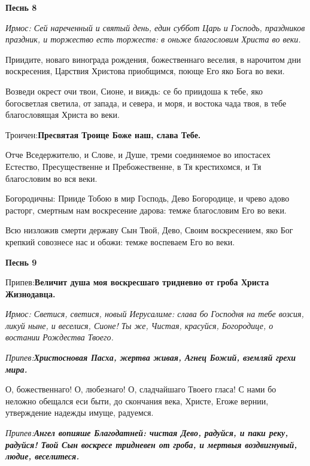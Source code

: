 \medskip\bfseries Песнь 8 

\normalfont{}\itshape Ирмос\normalfont{}: Сей нареченный и святый день, един суббот Царь и Господь, праздников праздник, и торжество есть торжеств: в оньже благословим Христа во веки. 



Приидите, новаго винограда рождения, божественнаго веселия, в нарочитом дни воскресения, Царствия Христова приобщимся, поюще Его яко Бога во веки. 



Возведи окрест очи твои, Сионе, и виждь: се бо приидоша к тебе, яко богосветлая светила, от запада, и севера, и моря, и востока чада твоя, в тебе благословящая Христа во веки. \itshape 

Троичен\normalfont{}:\bfseries  Пресвятая Троице Боже наш, слава Тебе\normalfont{}. 



Отче Вседержителю, и Слове, и Душе, треми соединяемое во ипостасех Естество, Пресущественне и Пребожественне, в Тя крестихомся, и Тя благословим во вся веки. \itshape 

Богородичны\normalfont{}: Прииде Тобою в мир Господь, Дево Богородице, и чрево адово расторг, смертным нам воскресение дарова: темже благословим Его во веки. 



Всю низложив смерти державу Сын Твой, Дево, Своим воскресением, яко Бог крепкий совознесе нас и обожи: темже воспеваем Его во веки. 

\medskip\bfseries Песнь 9 \normalfont{}\itshape 

Припев\normalfont{}:\bfseries  Величит душа моя воскресшаго тридневно от гроба Христа Жизнодавц\normalfont{}а. 

\itshape Ирмос\normalfont{}: Светися, светися, новый Иерусалиме: слава бо Господня на тебе возсия, ликуй ныне, и веселися, Сионе! Ты же, Чистая, красуйся, Богородице, о востании Рождества Твоего. 

\itshape Припев\normalfont{}:\bfseries  Христо\normalfont{}с\bfseries  новая Пасха, жертва живая, Агнец Божий, вземляй грехи мира\normalfont{}. 





О, божественнаго! О, любезнаго! О, сладчайшаго Твоего гласа! С нами бо неложно обещался еси быти, до скончания века, Христе, Егоже вернии,  утверждение надежды имуще, радуемся. 

\itshape Припев\normalfont{}:\bfseries  Ангел вопияше Благодатней: чистая Дево, радуйся, и паки реку, радуйся! Твой Сын воскресе тридневен от гроба, и мертвыя воздвигнувый, людие, веселитеся. \normalfont{}



